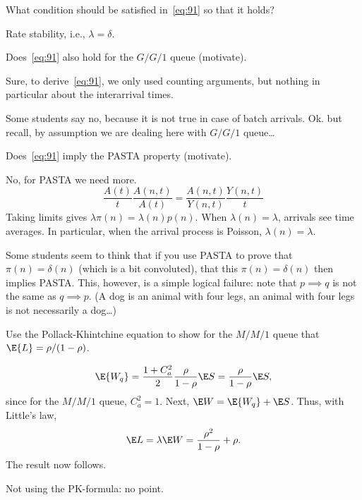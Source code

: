\begin{exercise}[201804]
 What condition should be satisfied in~\cref{eq:91} so that it holds? 
\begin{solution}
Rate stability, i.e., $\lambda = \delta$. 
\end{solution}
\end{exercise}

\begin{exercise}[201804]
Does~\cref{eq:91} also hold for the $G/G/1$ queue (motivate).
\begin{solution}
Sure, to derive~\cref{eq:91}, we only used counting arguments, but nothing in particular about the interarrival times. 

Some students say no, because it is not true in case of batch arrivals. Ok. but recall, by assumption we are dealing here with $G/G/1$ queue\ldots
\end{solution}
\end{exercise}

\begin{exercise}[201804]
Does~\cref{eq:91} imply the PASTA property (motivate).
\begin{solution}
No, for PASTA we need more. 
 \begin{equation*}
 \frac{A(t)}{t} \frac{A(n,t)}{A(t)} = \frac{A(n, t)}{Y(n, t)} \frac{Y(n,t)}{t}
 \end{equation*}
Taking limits gives $\lambda \pi(n) = \lambda(n) p(n)$. When $\lambda(n)=\lambda$, arrivals see time averages. In particular, when the arrival process is Poisson, $\lambda(n)=\lambda$. 

Some students seem to think that if you use PASTA to prove that $\pi(n)=\delta(n)$ (which is a bit convoluted), that this $\pi(n)=\delta(n)$ then implies PASTA. This, however, is a simple logical failure: note that $p\implies q$ is not the same as $q\implies p$. (A dog is an animal with four legs, an animal with four legs is not necessarily a dog\ldots)
\end{solution}

\end{exercise}

\begin{exercise}[201804]
 Use the Pollack-Khintchine equation to show for the $M/M/1$ queue that $\E{L}=\rho/(1-\rho)$. 
\begin{solution}
 \begin{equation*}
 \E{W_q}= \frac{1+C_a^2}2 \frac \rho{1-\rho} \E S = \frac \rho{1-\rho} \E S,
 \end{equation*}
since for the $M/M/1$ queue, $C_a^2=1$. Next, $\E W=\E{W_q} + \E S$. Thus, with Little's law, 
\begin{equation*}
\E L = \lambda \E W = \frac{\rho^2}{1-\rho} + \rho.
\end{equation*}
The result now follows.

Not using the PK-formula: no point. 
\end{solution}
\end{exercise}

